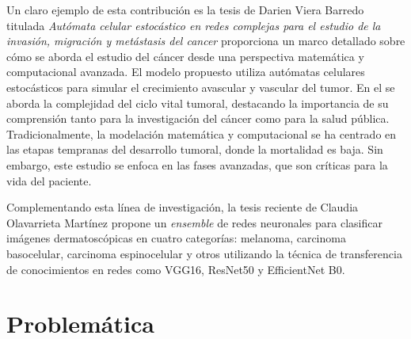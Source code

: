 Un claro ejemplo de esta contribución es la tesis de Darien Viera Barredo titulada \textit{Autómata celular estocástico en redes complejas para el estudio de la invasión, migración y metástasis del cancer}  proporciona un marco detallado sobre cómo se aborda el estudio del cáncer desde una perspectiva matemática y computacional avanzada. El modelo propuesto utiliza autómatas celulares estocásticos para simular el crecimiento avascular y vascular del tumor. En el se aborda la complejidad del ciclo vital tumoral, destacando la importancia de su comprensión tanto para la investigación del cáncer como para la salud pública. Tradicionalmente, la modelación matemática y computacional se ha centrado en las etapas tempranas del desarrollo tumoral, donde la mortalidad es baja. Sin embargo, este estudio se enfoca en las fases avanzadas, que son críticas para la vida del paciente.

Complementando esta línea de investigación, la tesis reciente de Claudia Olavarrieta Martínez  propone un \textit{ensemble} de redes neuronales para clasificar imágenes dermatoscópicas en cuatro categorías: melanoma, carcinoma basocelular, carcinoma espinocelular y otros utilizando la técnica de transferencia de conocimientos en redes como VGG16, ResNet50 y EfficientNet B0.



\section*{Problemática}

